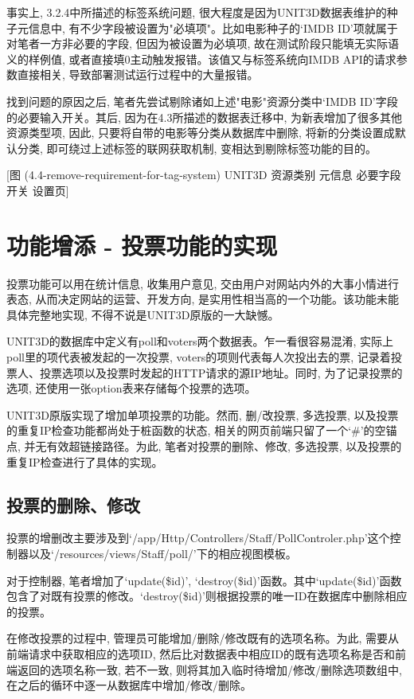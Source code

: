 事实上, 3.2.4中所描述的标签系统问题, 很大程度是因为UNIT3D数据表维护的种子元信息中, 有不少字段被设置为"必填项"。比如电影种子的`IMDB ID'项就属于对笔者一方非必要的字段, 但因为被设置为必填项, 故在测试阶段只能填无实际语义的样例值, 或者直接填0主动触发报错。该值又与标签系统向IMDB API的请求参数直接相关, 导致部署测试运行过程中的大量报错。

找到问题的原因之后, 笔者先尝试剔除诸如上述"电影"资源分类中`IMDB ID'字段的必要输入开关。其后, 因为在4.3所描述的数据表迁移中, 为新表增加了很多其他资源类型项, 因此, 只要将自带的电影等分类从数据库中删除, 将新的分类设置成默认分类, 即可绕过上述标签的联网获取机制, 变相达到剔除标签功能的目的。

[图 (4.4-remove-requirement-for-tag-system) UNIT3D 资源类别 元信息 必要字段开关 设置页]


\section{功能增添 - 投票功能的实现}

投票功能可以用在统计信息, 收集用户意见, 交由用户对网站内外的大事小情进行表态, 从而决定网站的运营、开发方向, 是实用性相当高的一个功能。该功能未能具体完整地实现, 不得不说是UNIT3D原版的一大缺憾。

UNIT3D的数据库中定义有poll和voters两个数据表。乍一看很容易混淆, 实际上poll里的项代表被发起的一次投票, voters的项则代表每人次投出去的票, 记录着投票人、投票选项以及投票时发起的HTTP请求的源IP地址。同时, 为了记录投票的选项, 还使用一张option表来存储每个投票的选项。

UNIT3D原版实现了增加单项投票的功能。然而, 删/改投票, 多选投票, 以及投票的重复IP检查功能都尚处于桩函数的状态, 相关的网页前端只留了一个`\#'的空锚点, 并无有效超链接路径。为此, 笔者对投票的删除、修改, 多选投票, 以及投票的重复IP检查进行了具体的实现。

\subsection{投票的删除、修改}

投票的增删改主要涉及到`/app/Http/Controllers/Staff/PollControler.php'这个控制器以及`/resources/views/Staff/poll/'下的相应视图模板。

对于控制器, 笔者增加了`update(\$id)', `destroy(\$id)'函数。其中`update(\$id)'函数包含了对既有投票的修改。`destroy(\$id)'则根据投票的唯一ID在数据库中删除相应的投票。

在修改投票的过程中, 管理员可能增加/删除/修改既有的选项名称。为此, 需要从前端请求中获取相应的选项ID, 然后比对数据表中相应ID的既有选项名称是否和前端返回的选项名称一致, 若不一致, 则将其加入临时待增加/修改/删除选项数组中, 在之后的循环中逐一从数据库中增加/修改/删除。

